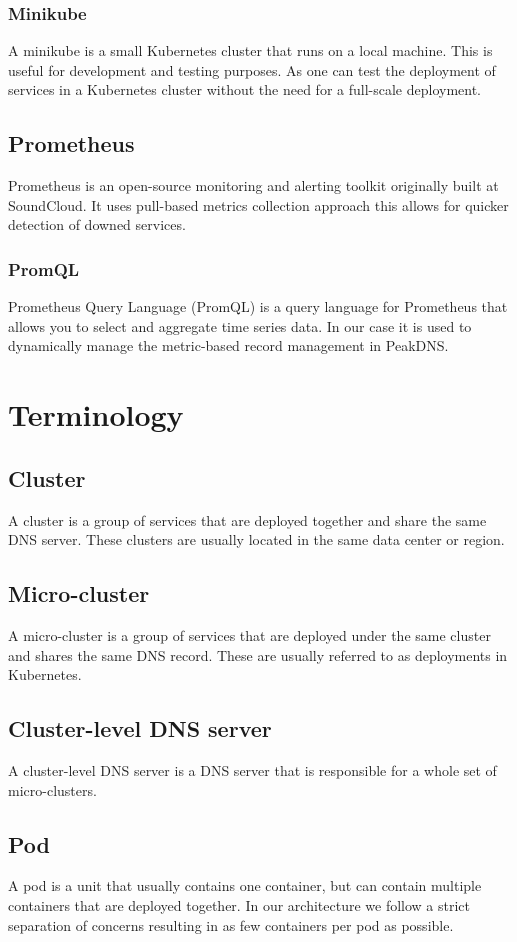 \documentclass[12pt]{article}
\begin{document}
\subsubsection{Minikube}
A minikube is a small Kubernetes cluster that runs on a local machine. This is useful for development and testing purposes.
As one can test the deployment of services in a Kubernetes cluster without the need for a full-scale deployment.

\subsection{Prometheus}
Prometheus is an open-source monitoring and alerting toolkit originally built at SoundCloud.
It uses pull-based metrics collection approach this allows for quicker detection of downed services.

\subsubsection{PromQL}
Prometheus Query Language (PromQL) is a query language for Prometheus that allows you to select and aggregate time series data.
In our case it is used to dynamically manage the metric-based record management in PeakDNS.

\section{Terminology}
\subsection{Cluster}
    A cluster is a group of services that are deployed together and share the same DNS server.
    These clusters are usually located in the same data center or region.
\subsection{Micro-cluster}
    A micro-cluster is a group of services that are deployed under the same cluster and shares the same DNS record.
    These are usually referred to as deployments in Kubernetes.
\subsection{Cluster-level DNS server}
    A cluster-level DNS server is a DNS server that is responsible for a whole set of micro-clusters.
\subsection{Pod}
    A pod is a unit that usually contains one container, but can contain multiple containers that are deployed together.
    In our architecture we follow a strict separation of concerns resulting in as few containers per pod as possible.
\end{document}
